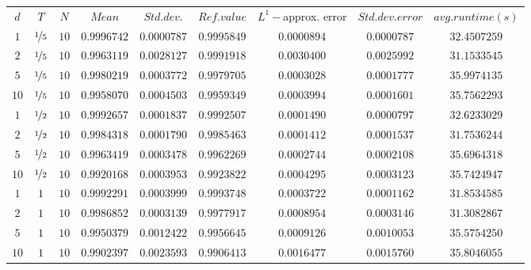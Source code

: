 \begin{tabular}{ccccccccc}
$d$ & $T$ & $N$ & $Mean$ & $Std. dev.$ & $Ref. value$ & $L^1-$approx. error & $Std. dev. error$ & $avg. runtime (s)$\\
$1$ & $\nicefrac{1}{5}$ & $10$ & $0.9996742$ & $0.0000787$ & $0.9995849$ & $0.0000894$ & $0.0000787$ & $32.4507259$\\
$2$ & $\nicefrac{1}{5}$ & $10$ & $0.9963119$ & $0.0028127$ & $0.9991918$ & $0.0030400$ & $0.0025992$ & $31.1533545$\\
$5$ & $\nicefrac{1}{5}$ & $10$ & $0.9980219$ & $0.0003772$ & $0.9979705$ & $0.0003028$ & $0.0001777$ & $35.9974135$\\
$10$ & $\nicefrac{1}{5}$ & $10$ & $0.9958070$ & $0.0004503$ & $0.9959349$ & $0.0003994$ & $0.0001601$ & $35.7562293$\\
$1$ & $\nicefrac{1}{2}$ & $10$ & $0.9992657$ & $0.0001837$ & $0.9992507$ & $0.0001490$ & $0.0000797$ & $32.6233029$\\
$2$ & $\nicefrac{1}{2}$ & $10$ & $0.9984318$ & $0.0001790$ & $0.9985463$ & $0.0001412$ & $0.0001537$ & $31.7536244$\\
$5$ & $\nicefrac{1}{2}$ & $10$ & $0.9963419$ & $0.0003478$ & $0.9962269$ & $0.0002744$ & $0.0002108$ & $35.6964318$\\
$10$ & $\nicefrac{1}{2}$ & $10$ & $0.9920168$ & $0.0003953$ & $0.9923822$ & $0.0004295$ & $0.0003123$ & $35.7424947$\\
$1$ & $1$ & $10$ & $0.9992291$ & $0.0003999$ & $0.9993748$ & $0.0003722$ & $0.0001162$ & $31.8534585$\\
$2$ & $1$ & $10$ & $0.9986852$ & $0.0003139$ & $0.9977917$ & $0.0008954$ & $0.0003146$ & $31.3082867$\\
$5$ & $1$ & $10$ & $0.9950379$ & $0.0012422$ & $0.9956645$ & $0.0009126$ & $0.0010053$ & $35.5754250$\\
$10$ & $1$ & $10$ & $0.9902397$ & $0.0023593$ & $0.9906413$ & $0.0016477$ & $0.0015760$ & $35.8046055$\\
\end{tabular}

